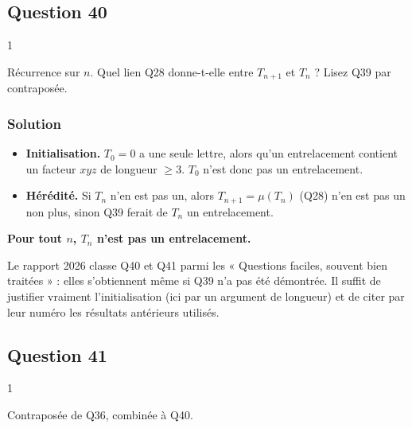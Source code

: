 \documentclass[11pt,a4paper]{article}
\providecommand{\tightlist}{\setlength{\itemsep}{0pt}\setlength{\parskip}{0pt}}
\begin{document}
\hypertarget{question-40}{%
\subsection{Question 40}\label{question-40}}

\begin{indication}{1}

Récurrence sur \(n\). Quel lien Q28 donne-t-elle entre \(T_{n+1}\) et \(T_n\) ? Lisez Q39 par contraposée.

\end{indication}

\hypertarget{solution-39}{%
\subsubsection{Solution}\label{solution-39}}

\begin{itemize}
\tightlist
\item
  \textbf{Initialisation.} \(T_0=0\) a une seule lettre, alors qu'un entrelacement contient un facteur \(xyz\) de longueur \(\ge 3\). \(T_0\) n'est donc pas un entrelacement.
\item
  \textbf{Hérédité.} Si \(T_n\) n'en est pas un, alors \(T_{n+1}=\mu(T_n)\) (Q28) n'en est pas un non plus, sinon Q39 ferait de \(T_n\) un entrelacement.
\end{itemize}

\textbf{Pour tout \(n\), \(T_n\) n'est pas un entrelacement.}

\begin{jury}

Le rapport 2026 classe Q40 et Q41 parmi les « Questions faciles, souvent bien traitées » : elles s'obtiennent même si Q39 n'a pas été démontrée. Il suffit de justifier vraiment l'initialisation (ici par un argument de longueur) et de citer par leur numéro les résultats antérieurs utilisés.

\end{jury}

\hypertarget{question-41}{%
\subsection{Question 41}\label{question-41}}

\begin{indication}{1}

Contraposée de Q36, combinée à Q40.

\end{indication}
\end{document}
